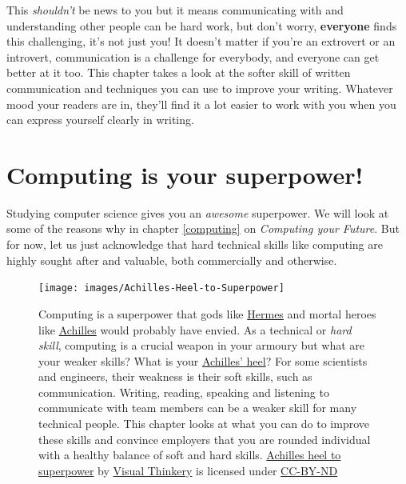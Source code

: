 \documentclass[
]{book}
\begin{document}
This \emph{shouldn't} be news to you but it means communicating with and understanding other people can be hard work, but don't worry, \textbf{everyone} finds this challenging, it's not just you! It doesn't matter if you're an extrovert or an introvert, communication is a challenge for everybody, and everyone can get better at it too. This chapter takes a look at the softer skill of written communication and techniques you can use to improve your writing. Whatever mood your readers are in, they'll find it a lot easier to work with you when you can express yourself clearly in writing.

\hypertarget{superpower}{%
\section{Computing is your superpower!}\label{superpower}}

Studying computer science gives you an \emph{awesome} superpower. We will look at some of the reasons why in chapter \ref{computing} on \emph{Computing your Future}. But for now, let us just acknowledge that hard technical skills like computing are highly sought after and valuable, both commercially and otherwise.

\begin{figure}

{\centering \texttt{[image: images/Achilles-Heel-to-Superpower]} 

}

\caption{Computing is a superpower that gods like \href{https://en.wikipedia.org/wiki/Hermes}{Hermes} and mortal heroes like \href{https://en.wikipedia.org/wiki/Achilles}{Achilles} would probably have envied. \citep{heroes, mythos} As a technical or \emph{hard skill}, computing is a crucial weapon in your armoury but what are your weaker skills? What is your \href{https://en.wikipedia.org/wiki/Achilles\%27_heel}{Achilles' heel}? For some scientists and engineers, their weakness is their soft skills, such as communication. Writing, reading, speaking and listening to communicate with team members can be a weaker skill for many technical people. This chapter looks at what you can do to improve these skills and convince employers that you are rounded individual with a healthy balance of soft and hard skills. \href{https://bryanmmathers.com/achilles-heel-to-superpower/}{Achilles heel to superpower} by \href{https://visualthinkery.com}{Visual Thinkery} is licensed under \href{https://creativecommons.org/licenses/by-nd/4.0/}{CC-BY-ND}}\label{fig:achilles-fig}
\end{figure}
\end{document}
